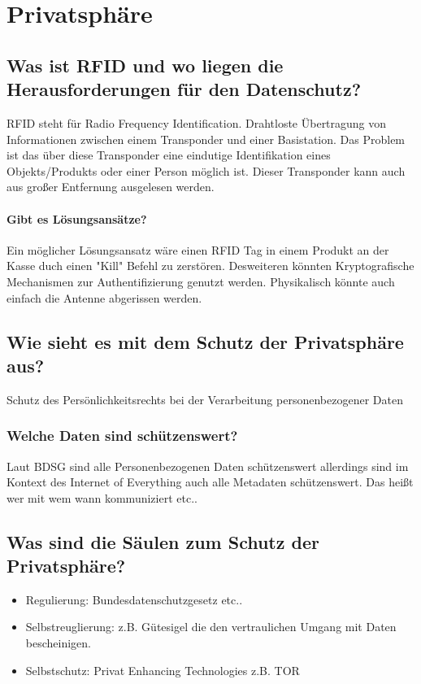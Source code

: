 \section{Privatsphäre}
	\subsection{Was ist RFID und wo liegen die Herausforderungen für den Datenschutz?}
	RFID steht für Radio Frequency Identification. Drahtloste Übertragung von Informationen zwischen einem Transponder und einer Basistation.
	Das Problem ist das über diese Transponder eine eindutige Identifikation eines Objekts/Produkts oder einer Person möglich ist. Dieser Transponder kann auch aus großer Entfernung ausgelesen werden.
	\paragraph{Gibt es Lösungsansätze?}
	Ein möglicher Lösungsansatz wäre einen RFID Tag in einem Produkt an der Kasse duch einen "Kill" Befehl zu zerstören.
	Desweiteren könnten Kryptografische Mechanismen zur Authentifizierung genutzt werden.
	Physikalisch könnte auch einfach die Antenne abgerissen werden.
	
	\subsection{Wie sieht es mit dem Schutz der Privatsphäre aus?}
	Schutz des Persönlichkeitsrechts bei der Verarbeitung personenbezogener Daten 
	\subsubsection{Welche Daten sind schützenswert?}
	Laut BDSG sind alle Personenbezogenen Daten schützenswert allerdings sind im Kontext des Internet of Everything auch alle Metadaten schützenswert. Das heißt wer mit wem wann kommuniziert etc..
	
	\subsection{Was sind die Säulen zum Schutz der Privatsphäre?}
	\begin{itemize}
		\item Regulierung: Bundesdatenschutzgesetz etc..
		\item Selbstreuglierung: z.B. Gütesigel die den vertraulichen Umgang mit Daten bescheinigen.
		\item Selbstschutz: Privat Enhancing Technologies z.B. TOR
	\end{itemize}
	
